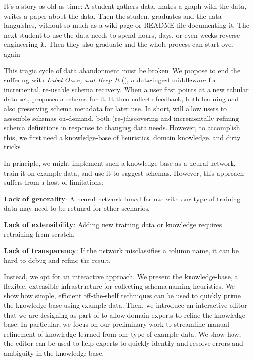 
It's a story as old as time: A student gathers data, makes a graph with the data, writes a paper about the data.
Then the student graduates and the data languishes, without so much as a wiki page or README file documenting it.
The next student to use the data needs to spend hours, days, or even weeks reverse-engineering it.
Then they also graduate and the whole process can start over again.

This tragic cycle of data abandonment must be broken.
We propose to end the suffering with \emph{Label Once, and Keep It} (\systemname), a data-ingest middleware for incremental, re-usable schema recovery.
When a user first points \systemname at a new tabular data set, \systemname proposes a schema for it.
It then collects feedback, both learning and also preserving schema metadata for later use.
In short, \systemname will allow users to assemble schemas on-demand, both (re-)discovering and incrementally refining schema definitions in response to changing data needs.
However, to accomplish this, we first need a knowledge-base of heuristics, domain knowledge, and dirty tricks.

In principle, we might implement such a knowledge base as a neural network, train it on example data, and use it to suggest schemas.
However, this approach suffers from a host of limitations:
\begin{enumerate*}
\item \textbf{Lack of generality}: A neural network tuned for use with one type of training data may need to be retuned for other scenarios.
\item \textbf{Lack of extensibility}: Adding new training data or knowledge requires retraining from scratch.
\item \textbf{Lack of transparency}: If the network misclassifies a column name, it can be hard to debug and refine the result.
\end{enumerate*}
Instead, we opt for an interactive approach.  We present the \systemname knowledge-base, a flexible, extensible infrastructure for collecting schema-naming heuristics.  
We show how simple, efficient off-the-shelf techniques can be used to quickly prime the knowledge-base using example data.
Then, we introduce an interactive editor that we are designing as part of \systemname to allow domain experts to refine the knowledge-base.
In particular, we focus on our preliminary work to streamline manual refinement of knowledge learned from one type of example data.
We show how, the editor can be used to help experts to quickly identify and resolve errors and ambiguity in the \systemname knowledge-base.

